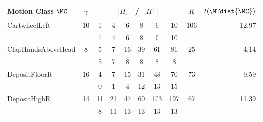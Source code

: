 \begin{table}[t]
\setlength{\tabcolsep}{0.8ex}
\begin{center}
\small
\renewcommand{\arraystretch}{0.6}
\begin{tabular}{|l|c|*{6}{c}|c|r|}
\hline
{ Motion Class $\MC$}             & $\gamma$ & \multicolumn{6}{c|}{$|H_{\tau}|$ \,\,/\,\, $|H_{\tau}^+|$} & $K$ & $t(\MTdist{\MC})$\\
\hline \hline \multirow{2}{*}{ CartwheelLeft} & \multirow{2}{*}{
10} & {\tiny    1} & {\tiny    4} & {\tiny    6} & {\tiny    8}
& {\tiny    9} & {\tiny   10} & \multirow{2}{*}{   106} &
\multirow{2}{*}{ 12.97} \\ & &
{\tiny    1} & {\tiny    4} & {\tiny    6} & {\tiny    8} & {\tiny    9} & {\tiny   10} & & \\
\hline
\multirow{2}{*}{            ClapHandsAboveHead} &
\multirow{2}{*}{   8} & {\tiny    5} & {\tiny    7} & {\tiny 16}
& {\tiny   39} & {\tiny   61} & {\tiny   81} & \multirow{2}{*}{
25} & \multirow{2}{*}{  4.14} \\ & &
{\tiny    5} & {\tiny    7} & {\tiny    8} & {\tiny    8} & {\tiny    8} & {\tiny    8} & & \\
\hline \multirow{2}{*}{                 DepositFloorR} &
\multirow{2}{*}{  16} & {\tiny    4} & {\tiny    7} & {\tiny
15} & {\tiny   31} & {\tiny   48} & {\tiny   70} &
\multirow{2}{*}{    73} & \multirow{2}{*}{  9.59} \\ & &
{\tiny    0} & {\tiny    1} & {\tiny    4} & {\tiny   12} & {\tiny   13} & {\tiny   15} & & \\
\hline \multirow{2}{*}{                  DepositHighR} &
\multirow{2}{*}{  14} & {\tiny   11} & {\tiny   21} & {\tiny
47} & {\tiny   60} & {\tiny  103} & {\tiny  197} &
\multirow{2}{*}{    67} & \multirow{2}{*}{ 11.39} \\ & &
{\tiny    8} & {\tiny   11} & {\tiny   13} & {\tiny   13} & {\tiny   13} & {\tiny   13} & & \\

\end{tabular}
\end{center}
\end{table}
